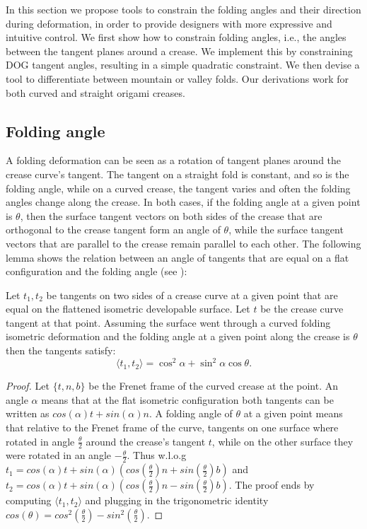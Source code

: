 In this section we propose tools to constrain the folding angles and their direction during deformation, in order to provide designers with more expressive and intuitive control. We first show how to constrain folding angles, i.e., the angles between the tangent planes around a crease. We implement this by constraining DOG tangent angles, resulting in a simple quadratic constraint. We then devise a tool to differentiate between mountain or valley folds. Our derivations work for both curved and straight origami creases.

\subsection{Folding angle} 

A folding deformation can be seen as a rotation of tangent planes around the crease curve's tangent. The tangent on a straight fold is constant, and so is the folding angle, while on a curved crease, the tangent varies and often the folding angles change along the crease. In both cases, if the folding angle at a given point is $\theta$, then the surface tangent vectors on both sides of the crease that are orthogonal to the crease tangent form an angle of $\theta$, while the surface tangent vectors that are parallel to the crease remain parallel to each other. The following lemma shows the relation between an angle of tangents that are equal on a flat configuration and the folding angle (see ): 
 \begin{lemma}  \label{lem:tangents_dihedral}
 Let $t_1,t_2$ be tangents on two sides of a crease curve at a given point that are equal on the flattened isometric developable surface. Let $t$ be the crease curve tangent at that point. Assuming the surface went through a curved folding isometric deformation and the folding angle at a given point along the crease is $\theta$ then the tangents satisfy:
\begin{equation} \label{eq:tangents_dihedral}
\langle t_1, t_2 \rangle = \cos^2\!\alpha + \sin^2\!\alpha \cos\theta. \end{equation}
\end{lemma}
\begin{proof}{Let $\{t,n,b\}$ be the Frenet frame of the curved crease at the point. An angle $\alpha$ means that at the flat isometric configuration both tangents can be written as $cos(\alpha)t + sin(\alpha)n$. A folding angle of $\theta$ at a given point means that relative to the Frenet frame of the curve, tangents on one surface where rotated in angle $\frac{\theta}{2}$ around the crease's tangent $t$, while on the other surface they were rotated in an angle  $-\frac{\theta}{2}$. Thus w.l.o.g $t_1 = cos(\alpha)t + sin(\alpha)(cos(\frac{\theta}{2})n+sin(\frac{\theta}{2})b)$ and $t_2 = cos(\alpha)t + sin(\alpha)(cos(\frac{\theta}{2})n-sin(\frac{\theta}{2})b)$. The proof ends by computing $\langle t_1,t_2 \rangle$ and plugging in the trigonometric identity $cos(\theta) = cos^2(\frac{\theta}{2})-sin^2(\frac{\theta}{2})$.}\end{proof}

